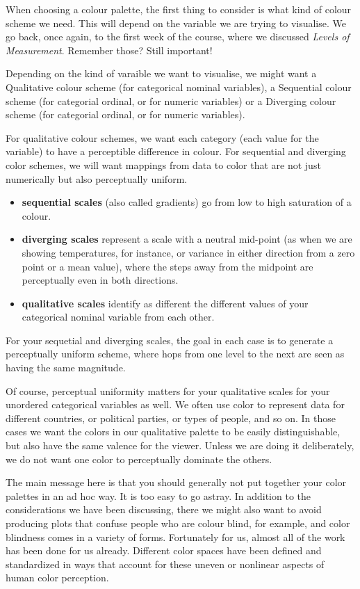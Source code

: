 \documentclass[
]{book}
\providecommand{\tightlist}{%
  \setlength{\itemsep}{0pt}\setlength{\parskip}{0pt}}
\begin{document}
When choosing a colour palette, the first thing to consider is what kind of colour scheme we need. This will depend on the variable we are trying to visualise. We go back, once again, to the first week of the course, where we discussed \emph{Levels of Measurement}. Remember those? Still important!

Depending on the kind of varaible we want to visualise, we might want a Qualitative colour scheme (for categorical nominal variables), a Sequential colour scheme (for categorial ordinal, or for numeric variables) or a Diverging colour scheme (for categorial ordinal, or for numeric variables).

For qualitative colour schemes, we want each category (each value for the variable) to have a perceptible difference in colour. For sequential and diverging color schemes, we will want mappings from data to color that are not just numerically but also perceptually uniform.

\begin{itemize}
\tightlist
\item
  \textbf{sequential scales} (also called gradients) go from low to high saturation of a colour.
\item
  \textbf{diverging scales} represent a scale with a neutral mid-point (as when we are showing temperatures, for instance, or variance in either direction from a zero point or a mean value), where the steps away from the midpoint are perceptually even in both directions.
\item
  \textbf{qualitative scales} identify as different the different values of your categorical nominal variable from each other.
\end{itemize}

For your sequetial and diverging scales, the goal in each case is to generate a perceptually uniform scheme, where hops from one level to the next are seen as having the same magnitude.

Of course, perceptual uniformity matters for your qualitative scales for your unordered categorical variables as well. We often use color to represent data for different countries, or political parties, or types of people, and so on. In those cases we want the colors in our qualitative palette to be easily distinguishable, but also have the same valence for the viewer. Unless we are doing it deliberately, we do not want one color to perceptually dominate the others.

The main message here is that you should generally not put together your color palettes in an ad hoc way. It is too easy to go astray. In addition to the considerations we have been discussing, there we might also want to avoid producing plots that confuse people who are colour blind, for example, and color blindness comes in a variety of forms. Fortunately for us, almost all of the work has been done for us already. Different color spaces have been defined and standardized in ways that account for these uneven or nonlinear aspects of human color perception.
\end{document}
